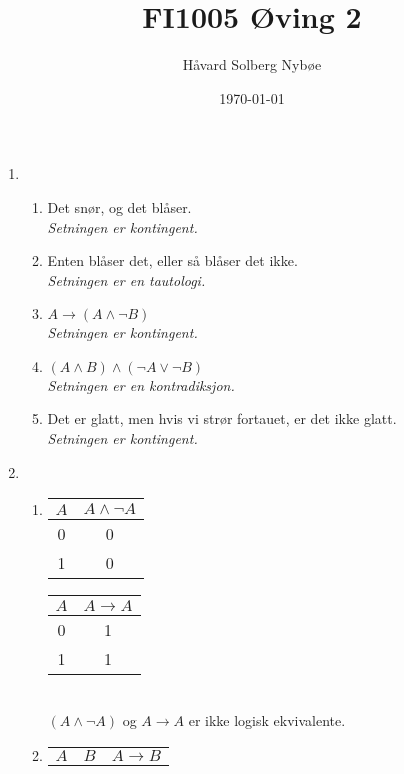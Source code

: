 \documentclass[a4paper, 12pt]{article}  %
\title{FI1005 Øving 2}                         %
\author{Håvard Solberg Nybøe}           %
\date{\today}                           %
\begin{document}
\maketitle


\begin{enumerate}
    \item [\boxed{1}]
    \begin{enumerate}
        \item Det snør, og det blåser.
        \\ \emph{Setningen er kontingent.}
        \item Enten blåser det, eller så blåser det ikke.
        \\ \emph{Setningen er en tautologi.}
        \item \(A \to (A \land \neg B)\)
        \\ \emph{Setningen er kontingent.}
        \item \((A \land B) \land (\neg A \lor \neg B)\)
        \\ \emph{Setningen er en kontradiksjon.}
        \item Det er glatt, men hvis vi strør fortauet, er det ikke glatt.
        \\ \emph{Setningen er kontingent.}
    \end{enumerate}
    \item [\boxed{2}]
    \begin{enumerate}
        \item 
        \begin{tabular}[t]{c|c}
            \(A\) & \(A \land \neg A \) \\
            \hline
            0 & 0 \\
            1 & 0 \\
        \end{tabular}
        \hspace*{1em}
        \begin{tabular}[t]{c|c}
            \(A\) & \(A \to A \) \\
            \hline
            0 & 1 \\
            1 & 1 \\
        \end{tabular}
        \\[1em]
        \((A \land \neg A)\) og \(A \to A\) er ikke logisk ekvivalente.
        \item
        \begin{tabular}[t]{cc|c}
            \(A\) & \(B\) & \(A \to B \) \\

\end{tabular}
\end{enumerate}
\end{enumerate}
\end{document}
